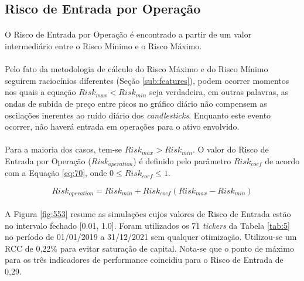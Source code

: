 \FloatBarrier
\subsection{Risco de Entrada por Operação}
\label{sub:operation_risk}

\paragraph{} O Risco de Entrada por Operação é encontrado a partir de um valor intermediário entre o Risco Mínimo e o Risco Máximo.

\paragraph{} Pelo fato da metodologia de cálculo do Risco Máximo e do Risco Mínimo seguirem raciocínios diferentes (Seção \ref{sub:features}), podem ocorrer momentos nos quais a equação \begin{math} Risk_{max} < Risk_{min} \end{math} seja verdadeira, em outras palavras, as ondas de subida de preço entre picos no gráfico diário não compensem as oscilações inerentes ao ruído diário dos \textit{candlesticks}. Enquanto este evento ocorrer, não haverá entrada em operações para o ativo envolvido.

\paragraph{} Para a maioria dos casos, tem-se \begin{math} Risk_{max} > Risk_{min} \end{math}. O valor do Risco de Entrada por Operação (\begin{math} Risk_{operation} \end{math}) é definido pelo parâmetro \begin{math} Risk_{coef} \end{math} de acordo com a Equação \ref{eq:70}, onde \begin{math} 0 \le Risk_{coef} \le 1 \end{math}.

\begin{equation} \label{eq:70}
    Risk_{operation} = Risk_{min} + Risk_{coef}(Risk_{max} - Risk_{min})
\end{equation}

\paragraph{} A Figura \ref{fig:553} resume as simulações cujos valores de Risco de Entrada estão no intervalo fechado [0.01, 1.0]. Foram utilizados os 71 \textit{tickers} da Tabela \ref{tab:5} no período de 01/01/2019 a 31/12/2021 sem qualquer otimização. Utilizou-se um RCC de 0,22\% para evitar saturação de capital. Nota-se que o ponto de máximo para os três indicadores de performance coincidiu para o Risco de Entrada de 0,29.

